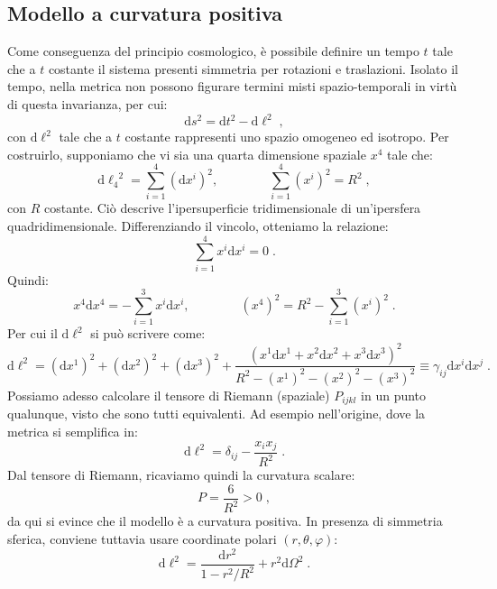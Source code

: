 \documentclass[12pt,a4paper]{report}
\theoremstyle{definition}
\newcommand{\diff}[1][]{\mathrm{d}#1}
\begin{document}
\subsection{Modello a curvatura positiva}
Come conseguenza del principio cosmologico, è possibile definire un tempo $t$ tale che a $t$ costante il sistema presenti simmetria per rotazioni e traslazioni. Isolato il tempo, nella metrica non possono figurare termini misti spazio-temporali in virtù di questa invarianza, per cui:
$$
\diff{s}^2=\diff{t}^2-\diff{\ell}^2\;,
$$
con $\diff{\ell}^2$ tale che a $t$ costante rappresenti uno spazio omogeneo ed isotropo. Per costruirlo, supponiamo che vi sia una quarta dimensione spaziale $x^4$ tale che:
\begin{equation}
\diff{\ell_4}^2=\sum_{i=1}^4(\diff{x^i})^2,\qquad\qquad \sum_{i=1}^4(x^i)^2=R^2\;,
\end{equation}
con $R$ costante. Ciò descrive l'ipersuperficie tridimensionale di un'ipersfera quadridimensionale. Differenziando il vincolo, otteniamo la relazione:
\begin{equation}
\sum_{i=1}^4x^i\diff{x^i}=0\;.
\end{equation}
Quindi:
\begin{equation}
x^4\diff{x^4}=-\sum_{i=1}^3x^i\diff{x^i},\qquad\qquad (x^4)^2=R^2-\sum_{i=1}^3(x^i)^2\;.
\end{equation}
Per cui il $\diff{\ell}^2$ si può scrivere come:
\begin{equation}
\diff{\ell}^2=(\diff{x^1})^2+(\diff{x^2})^2+(\diff{x^3})^2+\frac{(x^1\diff{x^1}+x^2\diff{x^2}+x^3\diff{x^3})^2}{R^2-(x^1)^2-(x^2)^2-(x^3)^2}\equiv \gamma_{ij}\diff{x^i}\diff{x^j}\;.
\end{equation}
Possiamo adesso calcolare il tensore di Riemann (spaziale) $P_{ijkl}$ in un punto qualunque, visto che sono tutti equivalenti. Ad esempio nell'origine, dove la metrica si semplifica in:
\begin{equation}
\diff{\ell}^2=\delta_{ij}-\frac{x_ix_j}{R^2}\;.
\end{equation}
Dal tensore di Riemann, ricaviamo quindi la curvatura scalare:
\begin{equation}
P=\frac{6}{R^2}>0\;,
\end{equation}
da qui si evince che il modello è a curvatura positiva. In presenza di simmetria sferica, conviene tuttavia usare coordinate polari $(r,\theta,\varphi)$:
\begin{equation}
\diff{\ell}^2=\frac{\diff{r}^2}{1-r^2/R^2}+r^2\diff{\Omega}^2\;. \label{ch6_polari}
\end{equation}
\end{document}
